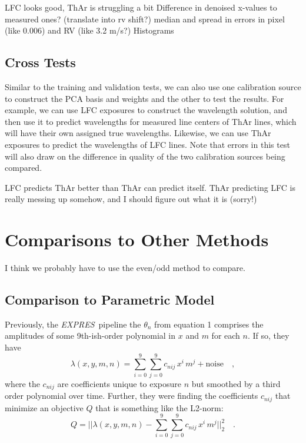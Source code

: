 \documentclass[12pt, letterpaper]{article}
\newcommand{\project}[1]{\textsl{#1}}
\newcommand{\acronym}[1]{{\small{#1}}}
\newcommand{\expres}{\project{\acronym{EXPRES}}}
\begin{document}
LFC looks good, ThAr is struggling a bit
Difference in denoised x-values to measured ones? (translate into rv shift?)
median and spread in errors in pixel (like 0.006) and RV (like 3.2 m/s?)
Histograms

\subsection{Cross Tests} \label{sec:test-cross}
Similar to the training and validation tests, we can also use one calibration source to construct the PCA basis and weights and the other to test the results.  For example, we can use LFC exposures to construct the wavelength solution, and then use it to predict wavelengths for measured line centers of ThAr lines, which will have their own assigned true wavelengths.  Likewise, we can use ThAr exposures to predict the wavelengths of LFC lines.  Note that errors in this test will also draw on the difference in quality of the two calibration sources being compared.

LFC predicts ThAr better than ThAr can predict itself.
ThAr predicting LFC is really messing up somehow, and I should figure out what it is (sorry!)


\section{Comparisons to Other Methods} \label{sec:comparisons}
I think we probably have to use the even/odd method to compare.

\subsection{Comparison to Parametric Model}
Previously, the \expres\ pipeline the $\theta_{n}$ from equation 1 comprises the
amplitudes of some 9th-ish-order polynomial in $x$ and $m$ for each $n$.
If so, they have
\begin{equation}
\lambda(x,y,m,n) = \sum_{i=0}^9\sum_{j=0}^9 c_{nij}\, x^i\,m^j + \mathrm{noise}
\quad ,
\end{equation}
where the $c_{nij}$ are coefficients unique to exposure $n$ but smoothed by a third order polynomial over time.
Further, they were finding the coefficients $c_{nij}$ that
minimize an objective $Q$ that is something like the L2-norm:
\begin{equation}
Q = ||\lambda(x,y,m,n) - \sum_{i=0}^9\sum_{j=0}^9 c_{nij}\, x^i\,m^j||_2^2
\quad .
\end{equation}
\end{document}
